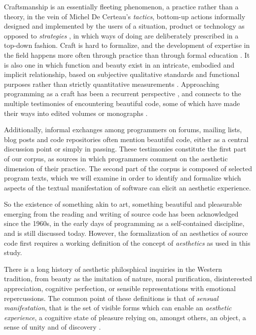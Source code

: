 Craftsmanship is an essentially fleeting phenomenon, a practice rather than a theory, in the vein of Michel De Certeau's \textit{tactics}, bottom-up actions informally designed and implemented by the users of a situation, product or technology as opposed to \textit{strategies} \citep{certeau_invention_1990}, in which ways of doing are deliberately prescribed in a top-down fashion. Craft is hard to formalize, and the development of expertise in the field happens more often through practice than through formal education \citep{sennett_craftsman_2009}. It is also one in which function and beauty exist in an intricate, embodied and implicit relationship, based on subjective qualitative standards and functional purposes rather than strictly quantitative measurements \citep{pye_nature_2008}. Approaching programming as a craft has been a recurrent perspective \citep{levy_programmation_1992,dijkstra_craftsman_1982}, and connects to the multiple testimonies of encountering beautiful code, some of which have made their ways into edited volumes or monographs \citep{oram_beautiful_2007,chandra_geek_2014,gabriel_patterns_1998}.

Additionally, informal exchanges among programmers on forums, mailing lists, blog posts and code repositories often mention beautiful code, either as a central discussion point or simply in passing. These testimonies constitute the first part of our corpus, as sources in which programmers comment on the aesthetic dimension of their practice. The second part of the corpus is composed of selected program texts, which we will examine in order to identify and formalize which aspects of the textual manifestation of software can elicit an aesthetic experience.

So the existence of something akin to art, something beautiful and pleasurable emerging from the reading and writing of source code has been acknowledged since the 1960s, in the early days of programming as a self-contained discipline, and is still discussed today. However, the formalization of an aesthetics of source code first requires a working definition of the concept of \emph{aesthetics} as used in this study.

There is a long history of aesthetic philosphical inquiries in the Western tradition, from beauty as the imitation of nature, moral purification, disinterested appreciation, cognitive perfection, or sensible representations with emotional repercussions. The common point of these definitions is that of \emph{sensual manifestation}, that is the set of visible forms which can enable an \emph{aesthetic experience}, a cognitive state of pleasure relying on, amongst others, an object, a sense of unity and of discovery \citep{beardsley_aesthetic_1970}.

